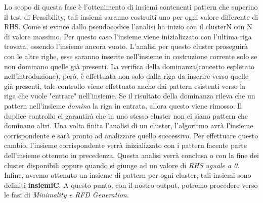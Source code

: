 Lo scopo di questa fase è l'ottenimento di insiemi contenenti pattern che superino il test di Feasibility, tali insiemi saranno costruiti uno per ogni valore differente di RHS.
Come si evince dallo pseudocodice l'analisi ha inizio con il clusterN con N di valore massimo.
Per questo caso l'insieme viene inizializzato con l'ultima riga trovata, essendo l'insieme ancora vuoto.
L'analisi per questo cluster proseguirà con le altre righe, esse saranno inserite nell'insieme in costruzione corrente solo se non dominano quelle già presenti. La verifica della dominanza(concetto espletato nell'introduzione), però, è effettuata non solo dalla riga da inserire verso quelle già presenti, tale controllo viene effettuato anche dai pattern esistenti verso la riga che vuole "entrare" nell'insieme. Se il risultato della dominanza rileva che un pattern nell'insieme \emph{domina} la riga in entrata, allora questo viene rimosso.
Il duplice controllo ci garantirà che in uno stesso cluster non ci siano pattern che dominano altri.
Una volta finita l'analisi di un cluster, l'algoritmo avrà l'insieme corrispondente e sarà pronto ad analizzare quello successivo. Per effettuare questo cambio, l'insieme corrispondente verrà inizializzato con i pattern facente parte dell'insieme ottenuto in precedenza.
Questa analisi verrà conclusa o con la fine dei cluster disponibili oppure quando si giunge ad un valore di \emph{RHS uguale a 0}.
Infine, avremo ottenuto un insieme di pattern per ogni cluster, tali insiemi sono definiti \textbf{insiemiC}.
A questo punto, con il nostro output, potremo procedere verso le fasi di \emph{Minimality e RFD Generation}.
